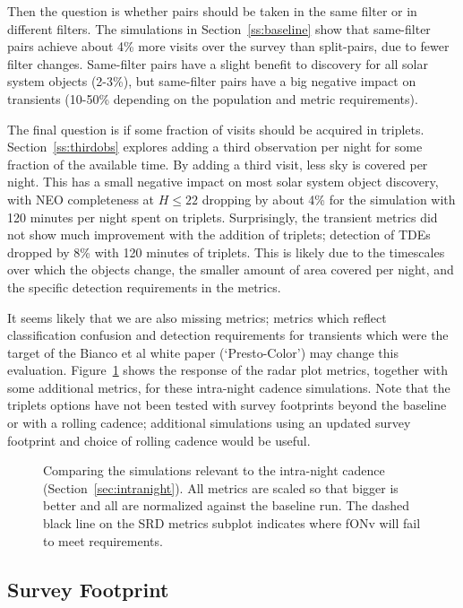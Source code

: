 Then the question is whether pairs should be taken in the same filter or in different filters. The simulations in Section~\ref{ss:baseline} show that same-filter pairs achieve about 4\% more visits over the survey than split-pairs, due to fewer filter changes. Same-filter pairs have a slight benefit to discovery for all solar system objects (2-3\%), but same-filter pairs have a big negative impact on transients (10-50\% depending on the population and metric requirements). 

The final question is if some fraction of visits should be acquired in triplets. Section~\ref{ss:thirdobs} explores adding a third observation per night for some fraction of the available time. By adding a third visit, less sky is covered per night. This has a small negative impact on most solar system object discovery, with NEO completeness at $H\le22$ dropping by about 4\% for the simulation with 120 minutes per night spent on triplets. Surprisingly, the transient metrics did not show much improvement with the addition of triplets; detection of TDEs dropped by 8\% with 120 minutes of triplets. This is likely due to the timescales over which the objects change, the smaller amount of area covered per night, and the specific detection requirements in the metrics.  

It seems likely that we are also missing metrics; metrics which reflect classification confusion and detection requirements for transients which were the target of the Bianco et al white paper (`Presto-Color') may change this evaluation. Figure~\ref{fig:intranight} shows the response of the radar plot metrics, together with some additional metrics, for these intra-night cadence simulations. Note that the triplets options have not been tested with survey footprints beyond the baseline or with a rolling cadence; additional simulations using an updated survey footprint and choice of rolling cadence would be useful. 

\begin{figure}
\caption{Comparing the simulations relevant to the intra-night cadence (Section~\ref{sec:intranight}). All metrics are scaled so that bigger is better and all are normalized against the baseline run. The dashed black line on the SRD metrics subplot indicates where fONv will fail to meet requirements.}
\label{fig:intranight}
\end{figure}


\subsection{Survey Footprint}\label{sec:bigfootprints}

